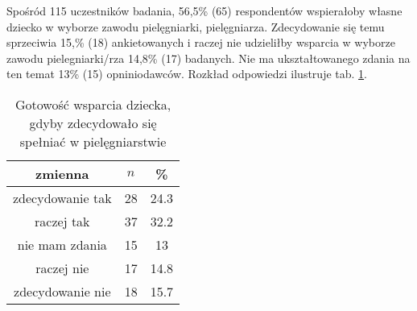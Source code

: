 


Spośród 115 uczestników badania, 56,5\% (65) respondentów wspierałoby własne dziecko w wyborze zawodu pielęgniarki, pielęgniarza. Zdecydowanie się temu sprzeciwia 15,\% (18) ankietowanych i raczej nie udzieliłby wsparcia w wyborze zawodu pielegniarki/rza 14,8\% (17) badanych. Nie ma ukształtowanego zdania na ten temat 13\% (15) opniniodawców. Rozkład odpowiedzi ilustruje tab. \ref{tab:Q37}.

\begin{table}[H]
\caption{Gotowość wsparcia dziecka, gdyby zdecydowało się spełniać w pielęgniarstwie}
\centering
\begin{tabular}{ | c | c | c |}
\hline
zmienna & $n$ & \% \\
\hline
zdecydowanie tak  &  28  & 24.3 \\
\hline
raczej tak  &  37  & 32.2 \\
\hline
nie mam zdania  &  15  & 13 \\
\hline
raczej nie  &  17  & 14.8 \\
\hline
zdecydowanie nie  &  18  & 15.7 \\
\hline
\end{tabular}
\label{tab:Q37}
\end{table}
